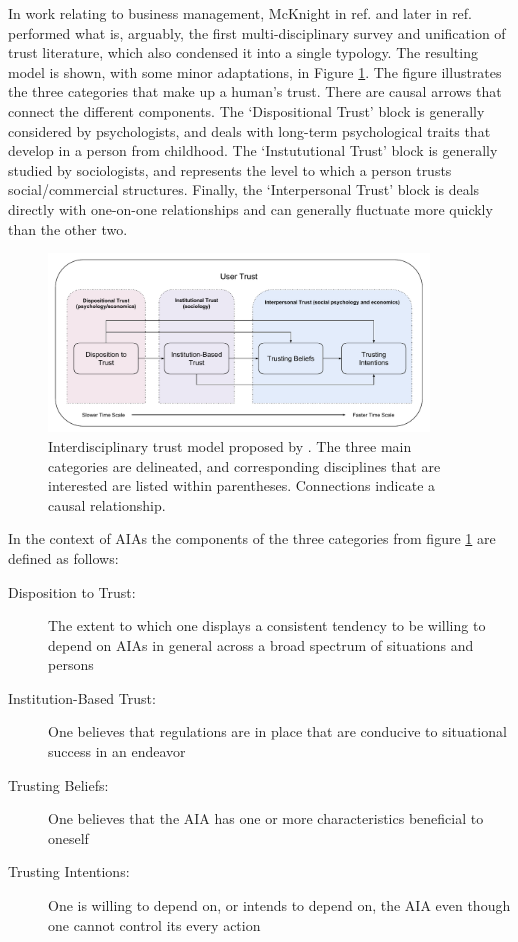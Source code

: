         In work relating to business management, McKnight in ref. \citet{McKnight1998-ty} and later in ref. \cite{McKnight2001-fa} performed what is, arguably, the first multi-disciplinary survey and unification of trust literature, which also condensed it into a single typology. The resulting model is shown, with some minor adaptations, in Figure \ref{fig:UserTrust}. The figure illustrates the three categories that make up a human's trust. There are causal arrows that connect the different components. The `Dispositional Trust' block is generally considered by psychologists, and deals with long-term psychological traits that develop in a person from childhood. The `Instututional Trust' block is generally studied by sociologists, and represents the level to which a person trusts social/commercial structures. Finally, the `Interpersonal Trust' block is deals directly with one-on-one relationships and can generally fluctuate more quickly than the other two.

        \begin{figure}[htbp]
            \centering
            \includegraphics[width=0.9\textwidth]{Figures/UserTrust}
            \caption{Interdisciplinary trust model proposed by \citet{McKnight2001-fa}. The three main categories are delineated, and corresponding disciplines that are interested are listed within parentheses. Connections indicate a causal relationship.}
            \label{fig:UserTrust}
        \end{figure}

        In the context of AIAs the components of the three categories from figure \ref{fig:UserTrust} are defined as follows:

        \begin{description}
            \item [Disposition to Trust:] The extent to which one displays a consistent tendency to be willing to depend on AIAs in general across a broad spectrum of situations and persons
            \item [Institution-Based Trust:] One believes that regulations are in place that are conducive to situational success in an endeavor
            \item [Trusting Beliefs:] One believes that the AIA has one or more characteristics beneficial to oneself
            \item [Trusting Intentions:] One is willing to depend on, or intends to depend on, the AIA even though one cannot control its every action
        \end{description}

